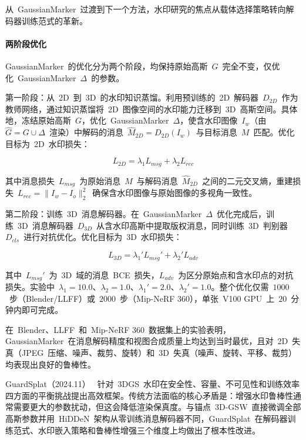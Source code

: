 从~GaussianMarker~过渡到下一个方法，水印研究的焦点从载体选择策略转向解码器训练范式的革新。

\paragraph{两阶段优化}
GaussianMarker~的优化分为两个阶段，均保持原始高斯~$G$~完全不变，仅优化~GaussianMarker~$\Delta$~的参数。

第一阶段：从~2D~到~3D~的水印知识蒸馏。利用预训练的~2D~解码器~$D_{2D}$~作为教师网络，通过知识蒸馏将~2D~图像空间的水印能力迁移到~3D~高斯空间。具体地，冻结原始高斯~$G$，优化~GaussianMarker~$\Delta$，使含水印图像~$I_w$（由~$\hat{G} = G \cup \Delta$~渲染）中解码的消息~$\hat{M}_{2D} = D_{2D}(I_w)$~与目标消息~$M$~匹配。优化目标为~2D~水印损失：

\begin{equation}
  L_{2D} = \lambda_1 L_{msg} + \lambda_2 L_{rec}
\end{equation}

其中消息损失~$L_{msg}$~为原始消息~$M$~与解码消息~$\hat{M}_{2D}$~之间的二元交叉熵，重建损失~$L_{rec} = \|I_w - I_o\|_2^2$~确保含水印图像与原始图像的多视角一致性。

第二阶段：训练~3D~消息解码器。在~GaussianMarker~$\Delta$~优化完成后，训练~3D~消息解码器~$D_{3D}$~从含水印高斯中提取版权消息，同时训练~3D~判别器~$D_{cls}$~进行对抗优化。优化目标为~3D~水印损失：

\begin{equation}
  L_{3D} = \lambda_1' L_{msg}' + \lambda_2' L_{adv}
\end{equation}

其中~$L_{msg}'$~为~3D~域的消息~BCE~损失，$L_{adv}$~为区分原始点和含水印点的对抗损失。实验中~$\lambda_1 = 10.0$、$\lambda_2 = 1.0$、$\lambda_1' = 2.0$、$\lambda_2' = 1.0$。整个优化仅需~$1000$~步（Blender/LLFF）或~$2000$~步（Mip-NeRF 360），单张~V100 GPU~上~$20$~分钟内即可完成。

在~Blender、LLFF~和~Mip-NeRF 360~数据集上的实验表明，GaussianMarker~在消息解码精度和视图合成质量上均达到当时最优，且对~2D~失真（JPEG~压缩、噪声、裁剪、旋转）和~3D~失真（噪声、旋转、平移、裁剪）均表现出良好的鲁棒性。

GuardSplat（2024.11）~\cite{2411_19895} 针对~3DGS~水印在安全性、容量、不可见性和训练效率四方面的平衡挑战提出高效框架。传统方法面临的核心矛盾是：增强水印鲁棒性通常需要更大的参数扰动，但这会降低渲染保真度。与锚点~3D-GSW~直接微调全部高斯参数并用~HiDDeN~架构从零训练消息解码器不同，GuardSplat~在解码器训练范式、水印嵌入策略和鲁棒性增强三个维度上均做出了根本性改进。

